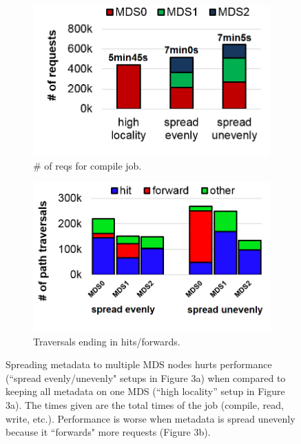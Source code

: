 \begin{figure}[tb]
	\begin{subfigure}[H]{0.47\textwidth}
		\centering	
		\caption{\# of reqs for compile job.}
		\label{figure:workload-tar-requests-total}
		\includegraphics[width=1\textwidth]{./chapters/mantle/figures/workload-tar-requests2.png}
	\end{subfigure}
	\begin{subfigure}[H]{0.47\textwidth}
		\centering
		\caption{Traversals ending in hits/forwards.}
		\label{figure:workload-tar-traverses}
	\includegraphics[width=1\textwidth]{./chapters/mantle/figures/workload-tar-traverses2.png}
	\end{subfigure}	
	\caption{Spreading metadata to multiple MDS nodes hurts performance (``spread evenly/unevenly" setups in Figure 3a) when compared to keeping all metadata on one MDS (``high locality'' setup in Figure 3a). The times given are the total times of the job (compile, read, write, etc.). Performance is worse when metadata is spread unevenly because it ``forwards" more requests (Figure 3b).\label{figure:workload-tar-requests}}
\end{figure}

